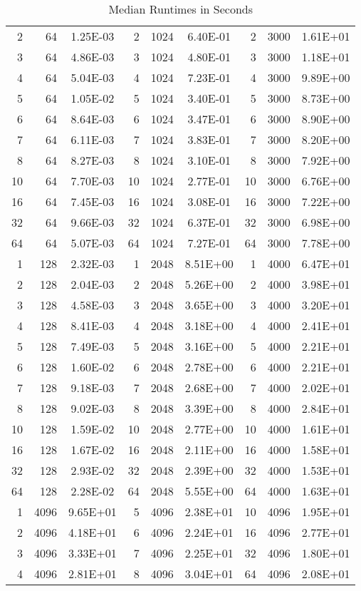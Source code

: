 \documentclass{article}
\begin{document}
\begin{table}[]
\begin{tabular}{|r|r|c||r|r|c||r|r|c|}
2&64&1.25E-03&2&1024&6.40E-01&2&3000&1.61E+01\\
3&64&4.86E-03&3&1024&4.80E-01&3&3000&1.18E+01\\
4&64&5.04E-03&4&1024&7.23E-01&4&3000&9.89E+00\\
5&64&1.05E-02&5&1024&3.40E-01&5&3000&8.73E+00\\
6&64&8.64E-03&6&1024&3.47E-01&6&3000&8.90E+00\\
7&64&6.11E-03&7&1024&3.83E-01&7&3000&8.20E+00\\
8&64&8.27E-03&8&1024&3.10E-01&8&3000&7.92E+00\\
10&64&7.70E-03&10&1024&2.77E-01&10&3000&6.76E+00\\
16&64&7.45E-03&16&1024&3.08E-01&16&3000&7.22E+00\\
32&64&9.66E-03&32&1024&6.37E-01&32&3000&6.98E+00\\
64&64&5.07E-03&64&1024&7.27E-01&64&3000&7.78E+00\\
\hline
1&128&2.32E-03&1&2048&8.51E+00&1&4000&6.47E+01\\
2&128&2.04E-03&2&2048&5.26E+00&2&4000&3.98E+01\\
3&128&4.58E-03&3&2048&3.65E+00&3&4000&3.20E+01\\
4&128&8.41E-03&4&2048&3.18E+00&4&4000&2.41E+01\\
5&128&7.49E-03&5&2048&3.16E+00&5&4000&2.21E+01\\
6&128&1.60E-02&6&2048&2.78E+00&6&4000&2.21E+01\\
7&128&9.18E-03&7&2048&2.68E+00&7&4000&2.02E+01\\
8&128&9.02E-03&8&2048&3.39E+00&8&4000&2.84E+01\\
10&128&1.59E-02&10&2048&2.77E+00&10&4000&1.61E+01\\
16&128&1.67E-02&16&2048&2.11E+00&16&4000&1.58E+01\\
32&128&2.93E-02&32&2048&2.39E+00&32&4000&1.53E+01\\
64&128&2.28E-02&64&2048&5.55E+00&64&4000&1.63E+01\\
\hline
1&4096&9.65E+01&5&4096&2.38E+01&10&4096&1.95E+01\\
2&4096&4.18E+01&6&4096&2.24E+01&16&4096&2.77E+01\\
3&4096&3.33E+01&7&4096&2.25E+01&32&4096&1.80E+01\\
4&4096&2.81E+01&8&4096&3.04E+01&64&4096&2.08E+01\\
\hline
    \end{tabular}
    \caption{Median Runtimes in Seconds}
    \label{tab:my_label}
\end{table}
\end{document}

